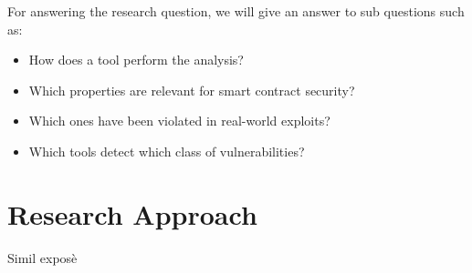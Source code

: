 For answering the research question, we will give an answer to sub questions such as: 
\begin{itemize}
  \item How does a tool perform the analysis? 
  \item Which properties are relevant for smart contract security?
  \item Which ones have been violated in real-world exploits? 
  \item Which tools detect which class of vulnerabilities? 
\end{itemize}

\section{Research Approach}
\label{sec:Introduction:ResearchApproach}
Simil exposè